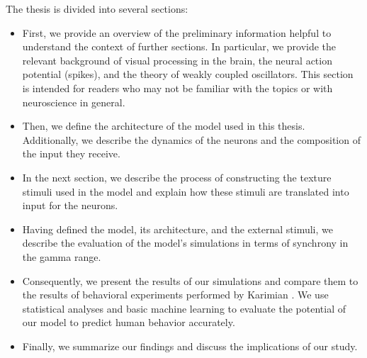 The thesis is divided into several sections:
\begin{itemize}
    \item First, we provide an overview of the preliminary information helpful to understand the context of further sections. In particular, we provide the relevant background of visual processing in the brain, the neural action potential (spikes), and the theory of weakly coupled oscillators. This section is intended for readers who may not be familiar with the topics or with neuroscience in general.

    \item Then, we define the architecture of the model used in this thesis. Additionally, we describe the dynamics of the neurons and the composition of the input they receive.

    \item In the next section, we describe the process of constructing the texture stimuli used in the model and explain how these stimuli are translated into input for the neurons.

    \item Having defined the model, its architecture, and the external stimuli, we describe the evaluation of the model's simulations in terms of synchrony in the gamma range.

    \item Consequently, we present the results of our simulations and compare them to the results of behavioral experiments performed by Karimian \cite{MaryamPLACEHOLDER}. We use statistical analyses and basic machine learning to evaluate the potential of our model to predict human behavior accurately.

    \item Finally, we summarize our findings and discuss the implications of our study.
\end{itemize}